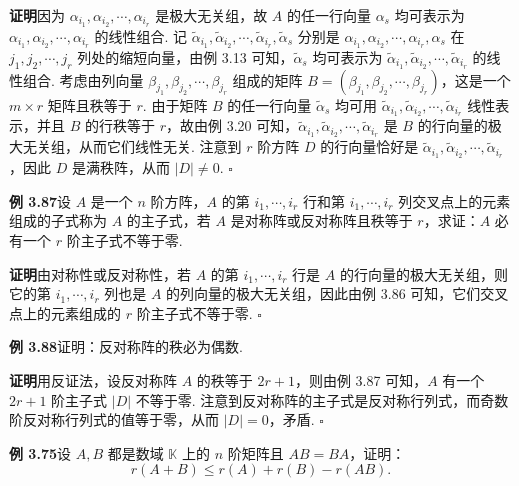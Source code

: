 \documentclass[UTF8,12pt,a4paper,fontset=fandol]{ctexart}
\begin{document}
\noindent\textbf{证明}\quad 因为 $\alpha_{i_1},\alpha_{i_2},\cdots,\alpha_{i_r}$ 是极大无关组，故 $A$ 的任一行向量 $\alpha_s$ 均可表示为 $\alpha_{i_1},\alpha_{i_2},\cdots,\alpha_{i_r}$ 的线性组合. 记 $\widetilde{\alpha}_{i_1},\widetilde{\alpha}_{i_2},\cdots,\widetilde{\alpha}_{i_r},\widetilde{\alpha}_s$ 分别是 $\alpha_{i_1},\alpha_{i_2},\cdots,\alpha_{i_r},\alpha_s$ 在 $j_1,j_2,\cdots,j_r$ 列处的缩短向量，由例 3.13 可知，$\widetilde{\alpha}_s$ 均可表示为 $\widetilde{\alpha}_{i_1},\widetilde{\alpha}_{i_2},\cdots,\widetilde{\alpha}_{i_r}$ 的线性组合. 考虑由列向量 $\beta_{j_1},\beta_{j_2},\cdots,\beta_{j_r}$ 组成的矩阵 $B=(\beta_{j_1},\beta_{j_2},\cdots,\beta_{j_r})$，这是一个 $m\times r$ 矩阵且秩等于 $r$. 由于矩阵 $B$ 的任一行向量 $\widetilde{\alpha}_s$ 均可用 $\widetilde{\alpha}_{i_1},\widetilde{\alpha}_{i_2},\cdots,\widetilde{\alpha}_{i_r}$ 线性表示，并且 $B$ 的行秩等于 $r$，故由例 3.20 可知，$\widetilde{\alpha}_{i_1},\widetilde{\alpha}_{i_2},\cdots,\widetilde{\alpha}_{i_r}$ 是 $B$ 的行向量的极大无关组，从而它们线性无关. 注意到 $r$ 阶方阵 $D$ 的行向量恰好是 $\widetilde{\alpha}_{i_1},\widetilde{\alpha}_{i_2},\cdots,\widetilde{\alpha}_{i_r}$，因此 $D$ 是满秩阵，从而 $|D|\ne 0$. $\square$

\noindent\textbf{例 3.87}\quad 设 $A$ 是一个 $n$ 阶方阵，$A$ 的第 $i_1,\cdots,i_r$ 行和第 $i_1,\cdots,i_r$ 列交叉点上的元素组成的子式称为 $A$ 的主子式，若 $A$ 是对称阵或反对称阵且秩等于 $r$，求证：$A$ 必有一个 $r$ 阶主子式不等于零.

\noindent\textbf{证明}\quad 由对称性或反对称性，若 $A$ 的第 $i_1,\cdots,i_r$ 行是 $A$ 的行向量的极大无关组，则它的第 $i_1,\cdots,i_r$ 列也是 $A$ 的列向量的极大无关组，因此由例 3.86 可知，它们交叉点上的元素组成的 $r$ 阶主子式不等于零. $\square$

\noindent\textbf{例 3.88}\quad 证明：反对称阵的秩必为偶数.

\noindent\textbf{证明}\quad 用反证法，设反对称阵 $A$ 的秩等于 $2r+1$，则由例 3.87 可知，$A$ 有一个 $2r+1$ 阶主子式 $|D|$ 不等于零. 注意到反对称阵的主子式是反对称行列式，而奇数阶反对称行列式的值等于零，从而 $|D|=0$，矛盾. $\square$

\noindent\textbf{例 3.75}\quad 设 $A,B$ 都是数域 $\mathbb{K}$ 上的 $n$ 阶矩阵且 $AB=BA$，证明：
\[
r(A+B)\le r(A)+r(B)-r(AB).
\]
\end{document}
